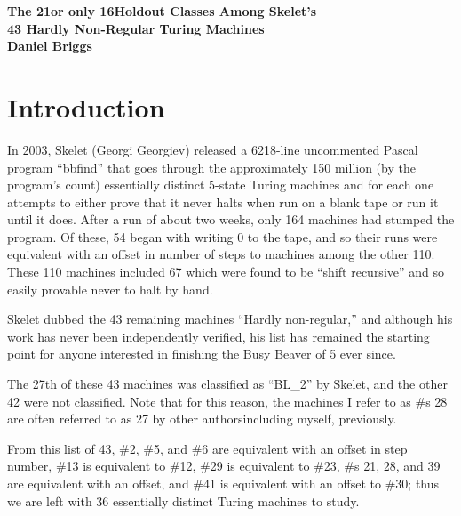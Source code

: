 \documentclass[12pt]{article}
\begin{document}
\begin{center}
 
{\bf\large The 21\textemdash or only 16\textemdash Holdout Classes Among Skelet's\\ 43 Hardly Non-Regular Turing Machines} \\
 
 
 
       \textbf{Daniel Briggs}


\end{center}


\section*{Introduction}
In 2003, Skelet (Georgi Georgiev) released a 6218-line uncommented Pascal program ``bbfind'' that goes through the approximately 150 million (by the program's count) essentially distinct 5-state Turing machines and for each one attempts to either prove that it never halts when run on a blank tape or run it until it does. After a run of about two weeks, only 164 machines had stumped the program. Of these, 54 began with writing 0 to the tape, and so their runs were equivalent with an offset in number of steps to machines among the other 110. These 110 machines included 67 which were found to be ``shift recursive'' and so easily provable never to halt by hand.

Skelet dubbed the 43 remaining machines ``Hardly non-regular,'' and although his work has never been independently verified, his list has remained the starting point for anyone interested in finishing the Busy Beaver of 5 ever since.

The 27th of these 43 machines was classified as ``BL\_2'' by Skelet, and the other 42 were not classified. Note that for this reason, the machines I refer to as \#s 28 are often referred to as 27 by other authors\textemdash including myself, previously.

From this list of 43, \#2, \#5, and \#6 are equivalent with an offset in step number, \#13 is equivalent to \#12,  \#29 is equivalent to \#23, \#s 21, 28, and 39 are equivalent with an offset,  and \#41 is equivalent with an offset to \#30; thus we are left with 36 essentially distinct Turing machines to study.
\end{document}

